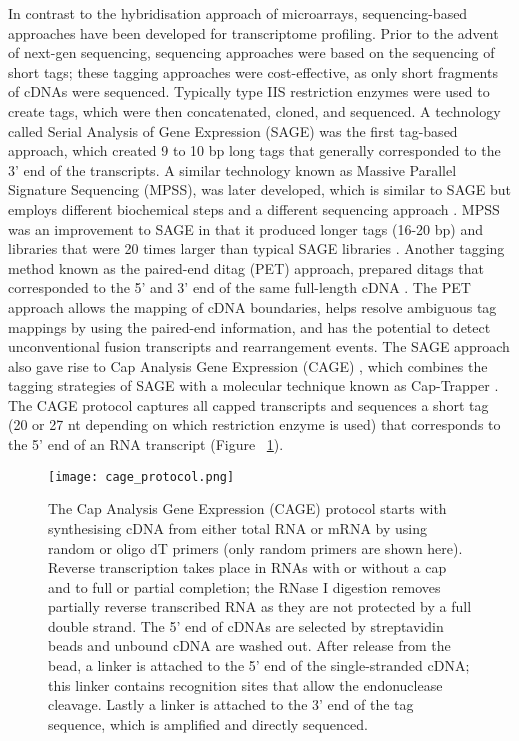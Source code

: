 In contrast to the hybridisation approach of microarrays, sequencing-based approaches have been developed for transcriptome profiling. Prior to the advent of next-gen sequencing, sequencing approaches were based on the sequencing of short tags; these tagging approaches were cost-effective, as only short fragments of cDNAs were sequenced. Typically type IIS restriction enzymes were used to create tags, which were then concatenated, cloned, and sequenced. A technology called Serial Analysis of Gene Expression (SAGE) \citep{pmid7570003} was the first tag-based approach, which created 9 to 10 bp long tags that generally corresponded to the 3' end of the transcripts. A similar technology known as Massive Parallel Signature Sequencing (MPSS), was later developed, which is similar to SAGE but employs different biochemical steps and a different sequencing approach \citep{pmid10835600}. MPSS was an improvement to SAGE in that it produced longer tags (16-20 bp) and libraries that were 20 times larger than typical SAGE libraries \citep{pmid10835600}. Another tagging method known as the paired-end ditag (PET) approach, prepared ditags that corresponded to the 5’ and 3’ end of the same full-length cDNA \citep{pmid15782207}. The PET approach allows the mapping of cDNA boundaries, helps resolve ambiguous tag mappings by using the paired-end information, and has the potential to detect unconventional fusion transcripts and rearrangement events. The SAGE approach also gave rise to Cap Analysis Gene Expression (CAGE) \citep{pmid14663149}, which combines the tagging strategies of SAGE with a molecular technique known as Cap-Trapper \citep{pmid8938445,pmid9179497}. The CAGE protocol captures all capped transcripts and sequences a short tag (20 or 27 nt depending on which restriction enzyme is used) that corresponds to the 5' end of an RNA transcript (Figure ~\ref{fig:cage_protocol}).

\begin{figure}[!ht]
   \centering
   \texttt{[image: cage\_protocol.png]}
   \caption[Cap Analysis Gene Expression protocol]{The Cap Analysis Gene Expression (CAGE) protocol starts with synthesising cDNA from either total RNA or mRNA by using random or oligo dT primers (only random primers are shown here). Reverse transcription takes place in RNAs with or without a cap and to full or partial completion; the RNase I digestion removes partially reverse transcribed RNA as they are not protected by a full double strand. The 5' end of cDNAs are selected by streptavidin beads and unbound cDNA are washed out. After release from the bead, a linker is attached to the 5' end of the single-stranded cDNA; this linker contains recognition sites that allow the endonuclease cleavage. Lastly a linker is attached to the 3' end of the tag sequence, which is amplified and directly sequenced.}
   \label{fig:cage_protocol}
\end{figure}

